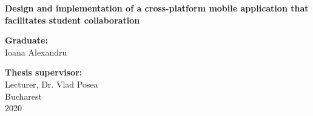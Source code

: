 \begin{center}
{\LARGE
	\textbf{Design and implementation of a cross-platform mobile application that facilitates student collaboration}
}

\vspace{3cm}
\textbf{Graduate:}\\
Ioana Alexandru

\bigskip
\bigskip

\textbf{Thesis supervisor:}\\
Lecturer, Dr. Vlad Posea \\

Bucharest \\
2020 \\
\vspace*{1cm}
\end{center}
